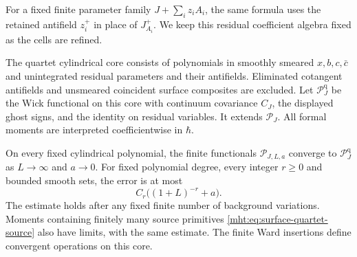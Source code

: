 For a fixed finite parameter family $J+\sum_i z_iA_i$, the same
formula uses the retained antifield $z_i^+$ in place of $J_{A_i}^+$.
We keep this residual coefficient algebra fixed as the cells are
refined.

The quartet cylindrical core consists of polynomials in smoothly
smeared $x,b,c,\bar c$ and unintegrated residual parameters and
their antifields. Eliminated cotangent antifields and unsmeared
coincident surface composites are excluded. Let
$\mathcal P_J^{\mathrm q}$ be the Wick functional on this core
with continuum covariance $C_J$, the displayed ghost signs, and
the identity on residual variables. It extends $\mathcal P_J$.
All formal moments are interpreted coefficientwise in $\hbar$.

\begin{proposition}\label{mht:prop:joint-quartet-limit}
On every fixed cylindrical polynomial, the finite functionals
$\mathcal P_{J,L,a}$ converge to $\mathcal P_J^{\mathrm q}$ as
$L\to\infty$ and $a\to0$. For fixed polynomial degree, every
integer $r\geq0$ and bounded smooth sets, the error is at most
\[
 C_r\bigl((1+L)^{-r}+a\bigr).
\]
The estimate holds after any fixed finite number of background
variations. Moments containing finitely many source primitives
\eqref{mht:eq:surface-quartet-source} also have limits, with the
same estimate. The finite Ward insertions define convergent
operations on this core.
\end{proposition}

